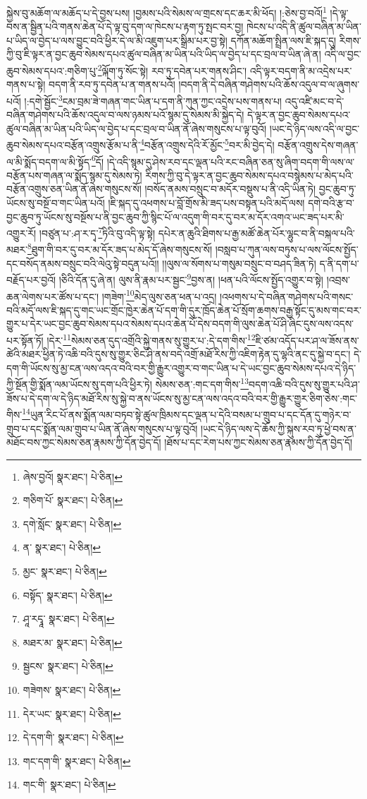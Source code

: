 སྐྱེས་བུ་མཆོག་ལ་མཆོད་པ་དེ་བྱས་པས། །བྱམས་པའི་སེམས་ལ་གྲངས་དང་ཆར་མི་ཕོད། །:ཅེས་བྱ་བའོ།\footnote{ཞེས་བྱའོ།  སྣར་ཐང་།  པེ་ཅིན། } །དེ་ལྟ་བས་ན་སྦྱིན་པའི་གནས་ཆེན་པོ་དེ་ལྟ་བུ་དག་ལ་ཁེངས་པ་རྟག་ཏུ་སྤང་བར་བྱ། ཁེངས་པ་འདི་ནི་ཚུལ་བཞིན་མ་ཡིན་པ་ཡིད་ལ་བྱེད་པ་ལས་བྱུང་བའི་ཕྱིར་དེ་ལ་མི་འཇུག་པར་སྒྲིམ་པར་བྱ་སྟེ། དཀོན་མཆོག་སྤྲིན་ལས་ཇི་སྐད་དུ། རིགས་ཀྱི་བུ་ཇི་ལྟར་ན་བྱང་ཆུབ་སེམས་དཔའ་ཚུལ་བཞིན་མ་ཡིན་པའི་ཡིད་ལ་བྱེད་པ་དང་བྲལ་བ་ཡིན་ཞེ་ན། འདི་ལ་བྱང་ཆུབ་སེམས་དཔའ་:གཅིག་པུ་\footnote{གཅིག་པོ་  སྣར་ཐང་།  པེ་ཅིན། }ལྐོག་ཏུ་སོང་སྟེ། རབ་ཏུ་དབེན་པར་གནས་ཤིང་། འདི་ལྟར་བདག་ནི་མ་འདྲེས་པར་གནས་པ་སྟེ། བདག་ནི་རབ་ཏུ་དབེན་པ་ན་གནས་པའོ། །བདག་ནི་དེ་བཞིན་གཤེགས་པའི་ཆོས་འདུལ་བ་ལ་ཞུགས་པའོ། །:དགེ་སྦྱོང་\footnote{དགེ་སློང་  སྣར་ཐང་།  པེ་ཅིན། }ངམ་བྲམ་ཟེ་གཞན་གང་ཡིན་པ་དག་ནི་ཀུན་ཀྱང་འདྲེས་པས་གནས་པ། འདུ་འཛི་མང་བ་དེ་བཞིན་གཤེགས་པའི་ཆོས་འདུལ་བ་ལས་ཉམས་པའོ་སྙམ་དུ་སེམས་མི་སྐྱེད་དེ། དེ་ལྟར་ན་བྱང་ཆུབ་སེམས་དཔའ་ཚུལ་བཞིན་མ་ཡིན་པའི་ཡིད་ལ་བྱེད་པ་དང་བྲལ་བ་ཡིན་ནོ་ཞེས་གསུངས་པ་ལྟ་བུའོ། །ཡང་དེ་ཉིད་ལས་འདི་ལ་བྱང་ཆུབ་སེམས་དཔའ་བརྩོན་འགྲུས་རྩོམ་པ་ནི་\footnote{ན་  སྣར་ཐང་།  པེ་ཅིན། }བརྩོན་འགྲུས་དེའི་རོ་མྱོང་\footnote{མྱང་  སྣར་ཐང་།  པེ་ཅིན། }བར་མི་བྱེད་དེ། བརྩོན་འགྲུས་དེས་གཞན་ལ་མི་སྨོད་བདག་ལ་མི་སྟོད་\footnote{བསྟོད་  སྣར་ཐང་།  པེ་ཅིན། }དོ། །དེ་འདི་སྙམ་དུ་ཤེས་རབ་དང་ལྡན་པའི་རང་བཞིན་ཅན་སུ་ཞིག་བདག་གི་ལས་ལ་བརྩོན་པས་གཞན་ལ་སྨོད་སྙམ་དུ་སེམས་ཏེ། རིགས་ཀྱི་བུ་དེ་ལྟར་ན་བྱང་ཆུབ་སེམས་དཔའ་བསྙེམས་པ་མེད་པའི་བརྩོན་འགྲུས་ཅན་ཡིན་ནོ་ཞེས་གསུངས་སོ། །བསོད་ནམས་བསྲུང་བ་མདོར་བསྡུས་པ་ནི་འདི་ཡིན་ཏེ། བྱང་ཆུབ་ཏུ་ཡོངས་སུ་བསྔོ་བ་གང་ཡིན་པའོ། །ཇི་སྐད་དུ་འཕགས་པ་བློ་གྲོས་མི་ཟད་པས་བསྟན་པའི་མདོ་ལས། དགེ་བའི་རྩ་བ་བྱང་ཆུབ་ཏུ་ཡོངས་སུ་བསྔོས་པ་ནི་བྱང་ཆུབ་ཀྱི་སྙིང་པོ་ལ་འདུག་གི་བར་དུ་བར་མ་དོར་འགའ་ཡང་ཟད་པར་མི་འགྱུར་རོ། །བཙུན་པ་:ཤ་ར་དྭ་\footnote{ཤཱ་རདྭཱ་  སྣར་ཐང་།  པེ་ཅིན། }ཏིའི་བུ་འདི་ལྟ་སྟེ། དཔེར་ན་ཆུའི་ཐིགས་པ་རྒྱ་མཚོ་ཆེན་པོར་ལྷུང་བ་ནི་བསྐལ་པའི་མཐར་\footnote{མཐར་མ་  སྣར་ཐང་།  པེ་ཅིན། }ཐུག་གི་བར་དུ་བར་མ་དོར་ཟད་པ་མེད་དོ་ཞེས་གསུངས་སོ། །བསླབ་པ་ཀུན་ལས་བཏུས་པ་ལས་ལོངས་སྤྱོད་དང་བསོད་ནམས་བསྲུང་བའི་ལེའུ་སྟེ་བདུན་པའོ།། །།ལུས་ལ་སོགས་པ་གསུམ་བསྲུང་བ་བཤད་ཟིན་ཏེ། ད་ནི་དག་པ་བརྗོད་པར་བྱའོ། །ཅིའི་དོན་དུ་ཞེ་ན། ལུས་ནི་རྣམ་པར་སྦྱང་\footnote{སྦྱངས་  སྣར་ཐང་།  པེ་ཅིན། }བྱས་ན། །ཕན་པའི་ལོངས་སྤྱོད་འགྱུར་བ་སྟེ། །འབྲས་ཆན་ལེགས་པར་ཚོས་པ་དང་། །གཟེག་\footnote{གཟེགས་  སྣར་ཐང་།  པེ་ཅིན། }མེད་ལུས་ཅན་ཕན་པ་འདྲ། །འཕགས་པ་དེ་བཞིན་གཤེགས་པའི་གསང་བའི་མདོ་ལས་ཇི་སྐད་དུ་གང་ཡང་གྲོང་ཁྱེར་ཆེན་པོ་དག་གི་དུར་ཁྲོད་ཆེན་པོ་སྲོག་ཆགས་བརྒྱ་སྟོང་དུ་མས་གང་བར་གྱུར་པ་དེར་ཡང་བྱང་ཆུབ་སེམས་དཔའ་སེམས་དཔའ་ཆེན་པོ་དེས་བདག་གི་ལུས་ཆེན་པོ་ཤི་ཞིང་དུས་ལས་འདས་པར་སྟོན་ཏོ། །དེར་\footnote{དེར་ཡང་  སྣར་ཐང་།  པེ་ཅིན། }སེམས་ཅན་དུད་འགྲོའི་སྐྱེ་གནས་སུ་གྱུར་པ་:དེ་དག་གིས་\footnote{དེ་དག་གི་  སྣར་ཐང་།  པེ་ཅིན། }ཇི་ཙམ་འདོད་པར་ཤ་ལ་ཟོས་ནས་ཚེའི་མཐར་ཕྱིན་ཏེ་འཆི་བའི་དུས་སུ་གྱུར་ཅིང་ཤི་ནས་བདེ་འགྲོ་མཐོ་རིས་ཀྱི་འཇིག་རྟེན་དུ་ལྷའི་ནང་དུ་སྐྱེ་བ་དང་། དེ་དག་གི་ཡོངས་སུ་མྱ་ངན་ལས་འདའ་བའི་བར་གྱི་རྒྱུར་འགྱུར་བ་གང་ཡིན་པ་དེ་ཡང་བྱང་ཆུབ་སེམས་དཔའ་དེ་ཉིད་ཀྱི་སྔོན་གྱི་སྨོན་ལམ་ཡོངས་སུ་དག་པའི་ཕྱིར་ཏེ། སེམས་ཅན་:གང་དག་གིས་\footnote{གང་དག་གི་  སྣར་ཐང་།  པེ་ཅིན། }བདག་འཆི་བའི་དུས་སུ་གྱུར་པའི་ཤ་ཟོས་པ་དེ་དག་ལ་དེ་ཉིད་མཐོ་རིས་སུ་སྐྱེ་བ་ནས་ཡོངས་སུ་མྱ་ངན་ལས་འདའ་བའི་བར་གྱི་རྒྱུར་གྱུར་ཅིག་ཅེས་:གང་གིས་\footnote{གང་གི་  སྣར་ཐང་།  པེ་ཅིན། }ཡུན་རིང་པོ་ནས་སྨོན་ལམ་བཏབ་སྟེ་ཚུལ་ཁྲིམས་དང་ལྡན་པ་དེའི་བསམ་པ་གྲུབ་པ་དང་དོན་དུ་གཉེར་བ་གྲུབ་པ་དང་སྨོན་ལམ་གྲུབ་པ་ཡིན་ནོ་ཞེས་གསུངས་པ་ལྟ་བུའོ། །ཡང་དེ་ཉིད་ལས་དེ་ཆོས་ཀྱི་སྐུས་རབ་ཏུ་ཕྱེ་བས་ན་མཐོང་བས་ཀྱང་སེམས་ཅན་རྣམས་ཀྱི་དོན་བྱེད་དོ། །ཐོས་པ་དང་རེག་པས་ཀྱང་སེམས་ཅན་རྣམས་ཀྱི་དོན་བྱེད་དོ། 